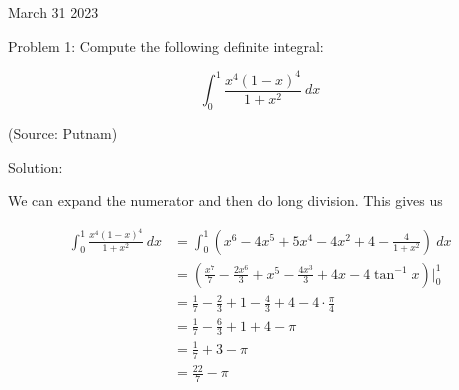 March 31 2023

Problem 1: Compute the following definite integral: 

$$\int_{0}^{1} \frac{x^4(1 - x)^4}{1 + x^2} \ dx$$

(Source: Putnam)

Solution:

We can expand the numerator and then do long division. This gives us

\begin{align*}
\int_{0}^{1} \frac{x^4(1 - x)^4}{1 + x^2} \ dx
&= \int_{0}^{1} \left(x^6 - 4x^5 + 5x^4 - 4x^2 + 4 - \frac{4}{1 + x^2}\right) \ dx \\
&= \left(\frac{x^7}{7} - \frac{2x^6}{3} + x^5 - \frac{4x^3}{3} + 4x - 4 \tan^{-1} x\right) \Bigg|_{0}^{1} \\
&= \frac{1}{7} - \frac{2}{3} + 1 - \frac{4}{3} + 4 - 4 \cdot \frac{\pi}{4} \\
&= \frac{1}{7} - \frac{6}{3} + 1 + 4 - \pi \\
&= \frac{1}{7} + 3 - \pi \\
&= \boxed{\frac{22}{7} - \pi}
\end{align*}

